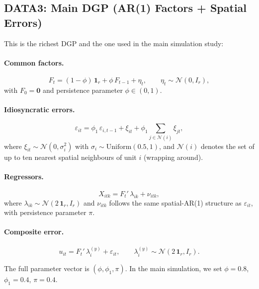 \documentclass[12pt, a4paper]{article}
\theoremstyle{plain}
\theoremstyle{definition}
\theoremstyle{remark}
\begin{document}
\begin{onehalfspacing}
\subsection{DATA3: Main DGP (AR(1) Factors + Spatial Errors)}
\label{sub:data3}

This is the richest DGP and the one used in the main simulation study:

\paragraph{Common factors.}
\begin{equation}
  F_t = (1 - \phi)\,\mathbf{1}_r + \phi\,F_{t-1} + \eta_t, \qquad
  \eta_t \sim \mathcal{N}(0, I_r),
\end{equation}
with $F_0 = \mathbf{0}$ and persistence parameter $\phi \in (0,1)$.

\paragraph{Idiosyncratic errors.}
\begin{equation}
  \varepsilon_{it} = \phi_1\,\varepsilon_{i,t-1}
    + \xi_{it}
    + \phi_1 \sum_{j \in \mathcal{N}(i)} \xi_{jt},
\end{equation}
where $\xi_{it} \sim \mathcal{N}(0, \sigma_i^2)$ with
$\sigma_i \sim \mathrm{Uniform}(0.5, 1)$, and $\mathcal{N}(i)$ denotes the
set of up to ten nearest spatial neighbours of unit $i$ (wrapping around).

\paragraph{Regressors.}
\begin{equation}
  X_{itk} = F_t'\,\lambda_{ik} + \nu_{itk},
\end{equation}
where $\lambda_{ik} \sim \mathcal{N}(2\,\mathbf{1}_r, I_r)$ and $\nu_{itk}$
follows the same spatial-AR(1) structure as $\varepsilon_{it}$, with
persistence parameter $\pi$.

\paragraph{Composite error.}
\begin{equation}
  u_{it} = F_t'\,\lambda_i^{(y)} + \varepsilon_{it}, \qquad
  \lambda_i^{(y)} \sim \mathcal{N}(2\,\mathbf{1}_r, I_r).
\end{equation}

The full parameter vector is $(\phi, \phi_1, \pi)$.  In the main simulation,
we set $\phi = 0.8$, $\phi_1 = 0.4$, $\pi = 0.4$.


\end{onehalfspacing}
\end{document}
